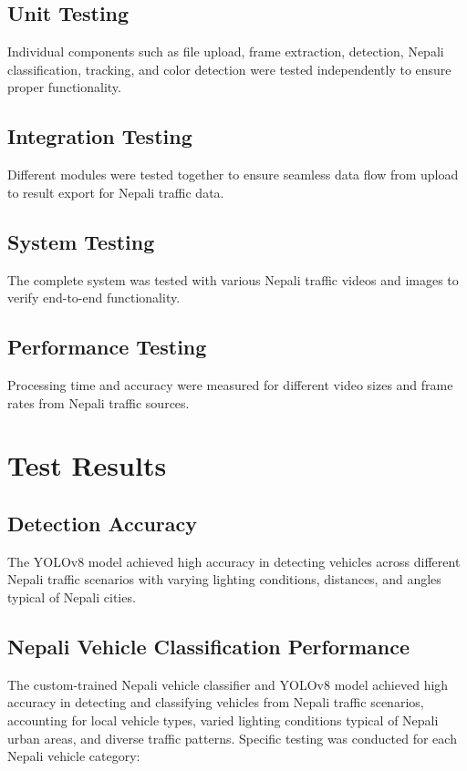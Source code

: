 \documentclass[12pt,a4paper]{report}
\begin{document}
\subsection{Unit Testing}
Individual components such as file upload, frame extraction, detection, Nepali classification, tracking, and color detection were tested independently to ensure proper functionality.

\subsection{Integration Testing}
Different modules were tested together to ensure seamless data flow from upload to result export for Nepali traffic data.

\subsection{System Testing}
The complete system was tested with various Nepali traffic videos and images to verify end-to-end functionality.

\subsection{Performance Testing}
Processing time and accuracy were measured for different video sizes and frame rates from Nepali traffic sources.

\section{Test Results}

\subsection{Detection Accuracy}
The YOLOv8 model achieved high accuracy in detecting vehicles across different Nepali traffic scenarios with varying lighting conditions, distances, and angles typical of Nepali cities.

\subsection{Nepali Vehicle Classification Performance}
The custom-trained Nepali vehicle classifier and YOLOv8 model achieved high accuracy in detecting and classifying vehicles from Nepali traffic scenarios, accounting for local vehicle types, varied lighting conditions typical of Nepali urban areas, and diverse traffic patterns. Specific testing was conducted for each Nepali vehicle category:
\end{document}

